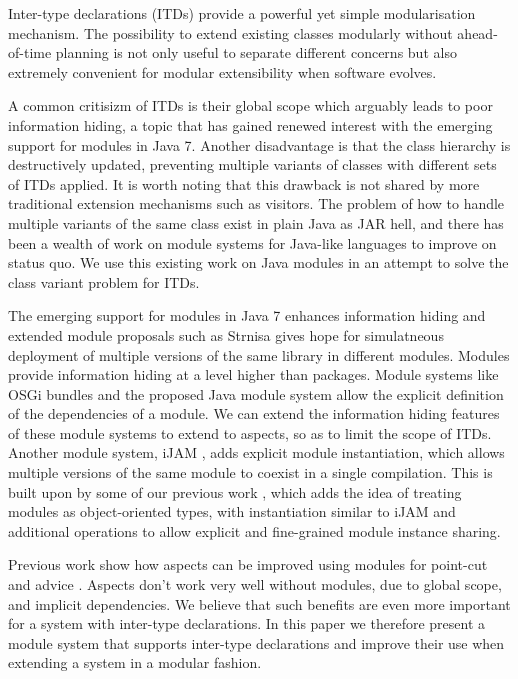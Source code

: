 Inter-type declarations (ITDs) provide a powerful yet simple modularisation
mechanism. The possibility to extend existing classes modularly without
ahead-of-time planning is not only useful to separate different concerns
but also extremely convenient for modular extensibility when software
evolves.

A common critisizm of ITDs is their global scope which arguably leads to
poor information hiding, a topic that has gained renewed interest with the 
emerging support for modules in Java 7. Another disadvantage is that the 
class hierarchy is destructively updated, preventing multiple variants of 
classes with different sets of ITDs applied. It is worth noting that 
this drawback is not shared by more traditional extension mechanisms such 
as visitors. The problem of how to handle multiple variants of the same 
class exist in plain Java as JAR hell, and there has been a wealth of work 
on module systems for Java-like languages to improve on status quo. We use 
this existing work on Java modules in an attempt to solve the class 
variant problem for ITDs.

The emerging support for modules in Java 7 enhances information hiding and
extended module proposals such as Strnisa gives hope for simulatneous
deployment of multiple versions of the same library in different modules.
Modules provide information hiding at a level higher than packages. Module
systems like OSGi bundles\cite{OSGi4} and the proposed Java module system\cite{JSR277}
allow the explicit definition of the dependencies of a module. We can extend
the information hiding features of these module systems to extend to aspects, 
so as to limit the scope of ITDs.
Another module system, iJAM \cite{iJAM}, adds explicit module instantiation, 
which allows multiple versions of the same module to coexist in a single compilation.
This is built upon by some of our previous work \cite{modulesastypes}, which 
adds the idea of treating modules as object-oriented types, with instantiation
similar to iJAM and additional operations to allow explicit and fine-grained
module instance sharing. 



Previous work show how aspects can be improved using modules for point-cut
and advice \cite{openmodulesaj}. Aspects don't work very well without 
modules, due to global scope, and implicit dependencies. We believe that 
such benefits are even more important for a system with inter-type 
declarations. In this paper we therefore present a module system that 
supports inter-type declarations and improve their use when extending a 
system in a modular fashion.

